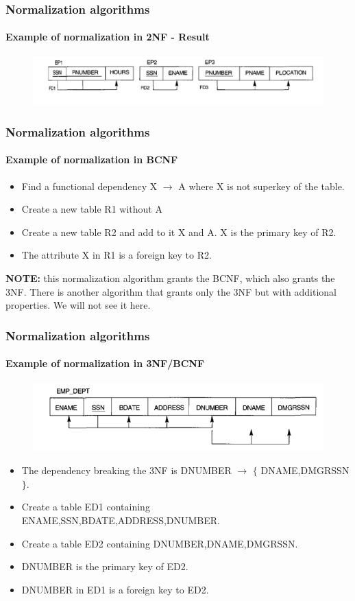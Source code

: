 \documentclass{beamer}
\newcommand{\valseq}[1]{$\lbrace$ #1 $\rbrace$}
\newcommand{\fdep}[2]{#1 $\rightarrow$ #2}
\begin{document}
\begin{frame}
	\frametitle{Normalization algorithms}
	\framesubtitle{Example of normalization in 2NF - Result}
	
	\begin{figure}
		\includegraphics[scale=0.4]{img/normalization/norm16}
	\end{figure}
\end{frame}

\begin{frame}
	\frametitle{Normalization algorithms}
	\framesubtitle{Example of normalization in BCNF}
	
	\begin{itemize}
		\item Find a functional dependency \fdep{X}{A} where X is not superkey of the table.
		\item Create a new table R1 without A
		\item Create a new table R2 and add to it X and A. X is the primary key of R2.
		\item The attribute X in R1 is a foreign key to R2.
	\end{itemize}
	
	\textbf{NOTE:} this normalization algorithm grants the BCNF, which also grants the 3NF. There is another algorithm that grants only the 3NF but with additional properties. We will not see it here.
\end{frame}

\begin{frame}
	\frametitle{Normalization algorithms}
	\framesubtitle{Example of normalization in 3NF/BCNF}
	
	\begin{figure}
		\includegraphics[scale=0.5]{img/normalization/norm17}
	\end{figure}
	
	\begin{itemize}
		\item The dependency breaking the 3NF is \fdep{DNUMBER}{\valseq{DNAME,DMGRSSN}}.
		\item Create a table ED1 containing ENAME,SSN,BDATE,ADDRESS,DNUMBER.
		\item Create a table ED2 containing DNUMBER,DNAME,DMGRSSN.
		\item DNUMBER is the primary key of ED2.
		\item DNUMBER in ED1 is a foreign key to ED2. 
		
	\end{itemize}
\end{frame}
\end{document}
